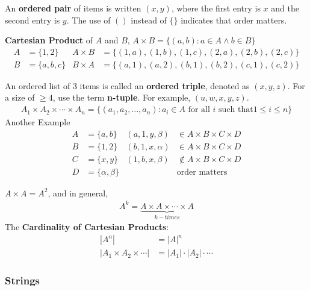 An \textbf{ordered pair} of items is written $(x, y)$, where the first entry is $x$ and the second entry is $y$.
The use of $()$ instead of $\{\}$ indicates that order matters.

\noindent \textbf{Cartesian Product} of $A$ and $B$, $A \times B = \{(a, b) : a \in A \land b \in B\}$
\begin{align*}
  A & = \{1, 2\}    & A \times B & = \{(1, a), (1, b), (1, c), (2, a), (2, b), (2, c)\} \\
  B & = \{a, b, c\} & B \times A & = \{(a, 1), (a, 2), (b, 1), (b, 2), (c, 1), (c, 2)\}
\end{align*}

An ordered list of 3 items is called an \textbf{ordered triple}, denoted as $(x, y, z)$.
For a size of $\geq 4$, use the term \textbf{n-tuple}. For example, $(u, w, x, y, z)$.
\begin{align*}
  A_1 \times A_2 \times \cdots \times A_n = \{(a_1, a_2, \ldots, a_n) : a_i \in A \text{ for all $i$ such that} 1 \leq i \leq n\}
\end{align*}
Another Example
\begin{align*}
  A & = \{a, b\}          & (a, 1, y, \beta)  & \in A \times B \times C \times D      \\
  B & = \{1, 2\}          & (b, 1, x, \alpha) & \in A \times B \times C \times D      \\
  C & = \{x, y\}          & (1, b, x, \beta)  & \not \in A \times B \times C \times D \\
  D & = \{\alpha, \beta\} &                   & \text{order matters}
\end{align*}

$A \times A = A^2$, and in general,
\begin{align*}
  A^k = \underbrace{A \times A \times \cdots \times A}_{k-times}
\end{align*}
The \textbf{Cardinality of Cartesian Products}:
\begin{align*}
  \left\lvert A^n \right\rvert                           & = {\left\lvert A \right\rvert}^n                                               \\
  \left\lvert A_1 \times A_2 \times \cdots  \right\rvert & = \left\lvert A_1 \right\rvert \cdot \left\lvert A_2 \right\rvert \cdot \cdots
\end{align*}

\subsubsection*{Strings}

